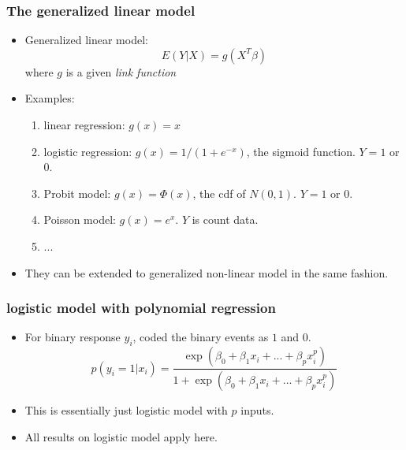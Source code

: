 \documentclass{beamer}
\begin{document}
         \begin{frame}
         	\frametitle{The generalized  linear model}
         	\begin{itemize}
         		
         		\item  Generalized linear model:
         		$$ E(Y|X) = g(X^T\beta)$$
         		where $g$ is a given {\it link function}
         		\item  Examples:
         		\begin{enumerate}
         			\item linear regression: $g(x)= x$
         			\item logistic regression: $g(x)= 1/(1+ e^{-x})$, the sigmoid function. $Y=1$ or $0$.
         			\item Probit model: $g(x)= \Phi(x)$, the cdf of $N(0, 1)$. $Y=1$ or $0$.
         			\item Poisson model: $g(x) = e^x$. $Y$ is count data.
         			\item ...
         		\end{enumerate}
         	 
         		\item They can be extended to generalized non-linear model in the same fashion.
         		
         	\end{itemize}
         \end{frame} 
         
           \begin{frame}
           	\frametitle{ logistic model with polynomial regression}
           	\begin{itemize}
           		
           		\item  For binary response $y_i$, coded the binary events as $1$ and $0$. 
           		$$ p(y_i =1|x_i) =  \frac{  \exp(\beta_0 + \beta_1 x_i + ...+ \beta_p x_i^p) }{ 1 + \exp(\beta_0 + \beta_1 x_i + ...+ \beta_p x_i^p)} $$
           		 
           		\item   This is essentially just logistic model with $p$ inputs.
           	 
           		\item All results on logistic model apply here.	
           	\end{itemize}
           \end{frame} 
        
         
           
\end{document}
